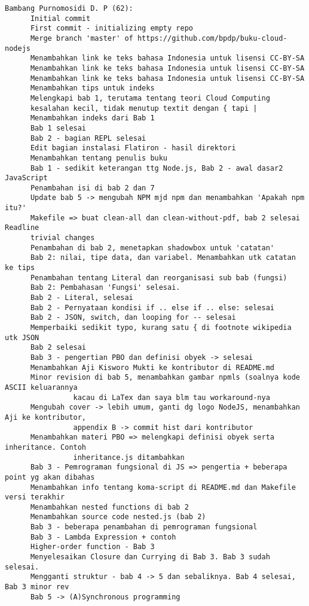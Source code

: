 \begin{lstlisting}
Bambang Purnomosidi D. P (62):
      Initial commit
      First commit - initializing empty repo
      Merge branch 'master' of https://github.com/bpdp/buku-cloud-nodejs
      Menambahkan link ke teks bahasa Indonesia untuk lisensi CC-BY-SA
      Menambahkan link ke teks bahasa Indonesia untuk lisensi CC-BY-SA
      Menambahkan link ke teks bahasa Indonesia untuk lisensi CC-BY-SA
      Menambahkan tips untuk indeks
      Melengkapi bab 1, terutama tentang teori Cloud Computing
      kesalahan kecil, tidak menutup textit dengan { tapi |
      Menambahkan indeks dari Bab 1
      Bab 1 selesai
      Bab 2 - bagian REPL selesai
      Edit bagian instalasi Flatiron - hasil direktori
      Menambahkan tentang penulis buku
      Bab 1 - sedikit keterangan ttg Node.js, Bab 2 - awal dasar2 JavaScript
      Penambahan isi di bab 2 dan 7
      Update bab 5 -> mengubah NPM mjd npm dan menambahkan 'Apakah npm itu?'
      Makefile => buat clean-all dan clean-without-pdf, bab 2 selesai Readline
      trivial changes
      Penambahan di bab 2, menetapkan shadowbox untuk 'catatan'
      Bab 2: nilai, tipe data, dan variabel. Menambahkan utk catatan ke tips
      Penambahan tentang Literal dan reorganisasi sub bab (fungsi)
      Bab 2: Pembahasan 'Fungsi' selesai.
      Bab 2 - Literal, selesai
      Bab 2 - Pernyataan kondisi if .. else if .. else: selesai
      Bab 2 - JSON, switch, dan looping for -- selesai
      Memperbaiki sedikit typo, kurang satu { di footnote wikipedia utk JSON
      Bab 2 selesai
      Bab 3 - pengertian PBO dan definisi obyek -> selesai
      Menambahkan Aji Kisworo Mukti ke kontributor di README.md
      Minor revision di bab 5, menambahkan gambar npmls (soalnya kode ASCII keluarannya 
				kacau di LaTex dan saya blm tau workaround-nya
      Mengubah cover -> lebih umum, ganti dg logo NodeJS, menambahkan Aji ke kontributor, 
				appendix B -> commit hist dari kontributor
      Menambahkan materi PBO => melengkapi definisi obyek serta inheritance. Contoh 
				inheritance.js ditambahkan
      Bab 3 - Pemrograman fungsional di JS => pengertia + beberapa point yg akan dibahas
      Menambahkan info tentang koma-script di README.md dan Makefile versi terakhir
      Menambahkan nested functions di bab 2
      Menambahkan source code nested.js (bab 2)
      Bab 3 - beberapa penambahan di pemrograman fungsional
      Bab 3 - Lambda Expression + contoh
      Higher-order function - Bab 3
      Menyelesaikan Closure dan Currying di Bab 3. Bab 3 sudah selesai.
      Mengganti struktur - bab 4 -> 5 dan sebaliknya. Bab 4 selesai, Bab 3 minor rev
      Bab 5 -> (A)Synchronous programming

\end{lstlisting}
